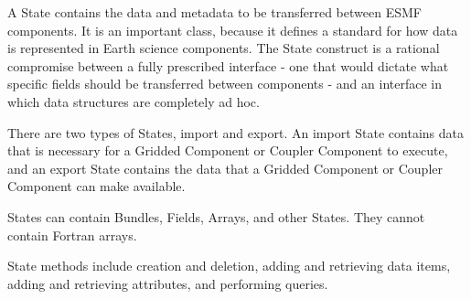 %


A State contains the data and metadata to be transferred between 
ESMF components.  It is an important class, because it defines a 
standard for how data is represented in Earth science components.  The 
State construct is a rational compromise between a fully prescribed 
interface - one that would dictate what specific fields should be 
transferred between components - and an interface in which data structures
are completely ad hoc.

There are two types of States, import and export.
An import State contains data that is necessary for a Gridded Component
or Coupler Component to execute, and an export State contains the data
that a Gridded Component or Coupler Component can make available.

States can contain Bundles, Fields, Arrays, and other States.  They
cannot contain Fortran arrays.

State methods include creation and deletion, adding and retrieving 
data items, adding and retrieving attributes, and performing queries.  

